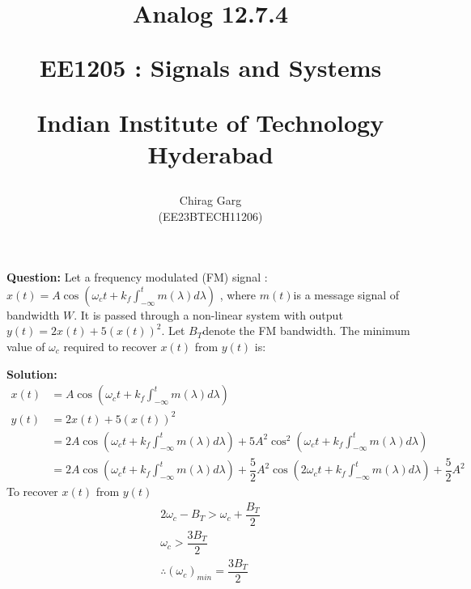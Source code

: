 \documentclass[journal,12pt,twocolumn]{IEEEtran}
\theoremstyle{remark}
\begin{document}
%






\title{
Analog 12.7.4

\large{EE1205 : Signals and Systems}

Indian Institute of Technology Hyderabad
}
\author{Chirag Garg

(EE23BTECH11206)
}	





\maketitle

\newpage



\bigskip

\renewcommand{\thefigure}{\theenumi}
\renewcommand{\thetable}{\theenumi}




\textbf{Question:} Let a frequency modulated (FM) signal : $ x(t) = A \cos(\omega_c t + k_f \int_{-\infty}^{t} m(\lambda) d\lambda)$ , where $ m(t) $is a message signal of bandwidth $ W $. It is passed through a non-linear system with output $y(t) = 2x(t) + 5(x(t))^2 $.
Let $B_T $denote the FM bandwidth. The minimum value of $ \omega_c $ required to recover $ x(t) $ from $ y(t) $ is:



\textbf{Solution: }
\begin{align}
 x(t) &= A \cos(\omega_c t + k_f \int_{-\infty}^{t} m(\lambda) d\lambda) \\
 y(t) &= 2x(t) + 5(x(t))^2 \\
 &= 2A \cos(\omega_c t + k_f \int_{-\infty}^{t} m(\lambda) d\lambda) + 5A^{2}\cos^{2}(\omega_c t + k_f \int_{-\infty}^{t} m(\lambda) d\lambda) \\
 &= 2A \cos(\omega_c t + k_f \int_{-\infty}^{t} m(\lambda) d\lambda) + \dfrac{5}{2}A^{2}\cos(2\omega_c t + k_f \int_{-\infty}^{t} m(\lambda) d\lambda) + \dfrac{5}{2}A^{2}
 \end{align}
To recover $x(t)$ from $y(t)$
\begin{align}
2\omega_c - B_T > \omega_c + \dfrac{B_T}{2} \\
\omega_c > \dfrac{3B_T}{2} \\
\therefore(\omega_c)_{min} = \dfrac{3B_T}{2} 
\end{align}
\end{document}
